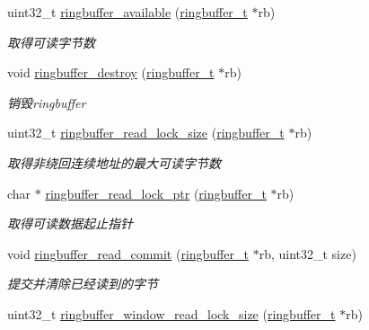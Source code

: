 \begin{DoxyCompactItemize}
uint32\+\_\+t \hyperlink{a00083_a4fca0cda42cddc178da4ab3abd92ae3a_a4fca0cda42cddc178da4ab3abd92ae3a}{ringbuffer\+\_\+available} (\hyperlink{a00050_af929c5cf86b6a0f64dde407dfe60482e_af929c5cf86b6a0f64dde407dfe60482e}{ringbuffer\+\_\+t} $\ast$rb)
\begin{DoxyCompactList}\small\item\em 取得可读字节数 \end{DoxyCompactList}\item 
void \hyperlink{a00083_a968f7b808cc3085482292c1f31d92740_a968f7b808cc3085482292c1f31d92740}{ringbuffer\+\_\+destroy} (\hyperlink{a00050_af929c5cf86b6a0f64dde407dfe60482e_af929c5cf86b6a0f64dde407dfe60482e}{ringbuffer\+\_\+t} $\ast$rb)
\begin{DoxyCompactList}\small\item\em 销毁ringbuffer \end{DoxyCompactList}\item 
uint32\+\_\+t \hyperlink{a00083_a17f80ee6eedc285a3086107f10d0605b_a17f80ee6eedc285a3086107f10d0605b}{ringbuffer\+\_\+read\+\_\+lock\+\_\+size} (\hyperlink{a00050_af929c5cf86b6a0f64dde407dfe60482e_af929c5cf86b6a0f64dde407dfe60482e}{ringbuffer\+\_\+t} $\ast$rb)
\begin{DoxyCompactList}\small\item\em 取得非绕回连续地址的最大可读字节数 \end{DoxyCompactList}\item 
char $\ast$ \hyperlink{a00083_a7611ebce8ddc6637724794195ad6c035_a7611ebce8ddc6637724794195ad6c035}{ringbuffer\+\_\+read\+\_\+lock\+\_\+ptr} (\hyperlink{a00050_af929c5cf86b6a0f64dde407dfe60482e_af929c5cf86b6a0f64dde407dfe60482e}{ringbuffer\+\_\+t} $\ast$rb)
\begin{DoxyCompactList}\small\item\em 取得可读数据起止指针 \end{DoxyCompactList}\item 
void \hyperlink{a00083_aea7ff5a3bd3ede77f076abaefad3fcb1_aea7ff5a3bd3ede77f076abaefad3fcb1}{ringbuffer\+\_\+read\+\_\+commit} (\hyperlink{a00050_af929c5cf86b6a0f64dde407dfe60482e_af929c5cf86b6a0f64dde407dfe60482e}{ringbuffer\+\_\+t} $\ast$rb, uint32\+\_\+t size)
\begin{DoxyCompactList}\small\item\em 提交并清除已经读到的字节 \end{DoxyCompactList}\item 
uint32\+\_\+t \hyperlink{a00083_a0c3a46a4cfef551f1117b178748f718e_a0c3a46a4cfef551f1117b178748f718e}{ringbuffer\+\_\+window\+\_\+read\+\_\+lock\+\_\+size} (\hyperlink{a00050_af929c5cf86b6a0f64dde407dfe60482e_af929c5cf86b6a0f64dde407dfe60482e}{ringbuffer\+\_\+t} $\ast$rb)

\end{DoxyCompactItemize}
